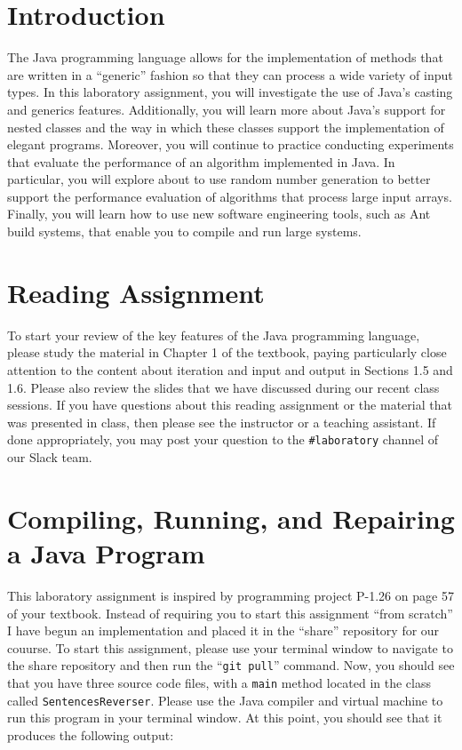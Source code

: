 

\usepackage[compact]{titlesec}



\section*{Introduction}

The Java programming language allows for the implementation of methods that are written in a ``generic'' fashion so that
they can process a wide variety of input types. In this laboratory assignment, you will investigate the use of Java's
casting and generics features. Additionally, you will learn more about Java's support for nested classes and the way in
which these classes support the implementation of elegant programs. Moreover, you will continue to practice conducting
experiments that evaluate the performance of an algorithm implemented in Java. In particular, you will explore about to
use random number generation to better support the performance evaluation of algorithms that process large input arrays.
Finally, you will learn how to use new software engineering tools, such as Ant build systems, that enable you to
compile and run large systems.

\section*{Reading Assignment}

To start your review of the key features of the Java programming language, please study the material in Chapter 1 of the
textbook, paying particularly close attention to the content about iteration and input and output in Sections 1.5 and
1.6. Please also review the slides that we have discussed during our recent class sessions. If you have questions about
this reading assignment or the material that was presented in class, then please see the instructor or a teaching
assistant. If done appropriately, you may post your question to the {\tt \#laboratory} channel of our Slack team.

\section*{Compiling, Running, and Repairing a Java Program}

This laboratory assignment is inspired by programming project P-1.26 on page 57 of your textbook. Instead of requiring
you to start this assignment ``from scratch'' I have begun an implementation and placed it in the ``share'' repository
for our couurse. To start this assignment, please use your terminal window to navigate to the share repository and then
run the ``{\tt git pull}'' command. Now, you should see that you have three source code files, with a {\tt main}
method located in the class called {\tt SentencesReverser}. Please use the Java compiler and virtual machine to run this
program in your terminal window. At this point, you should see that it produces the following output:

